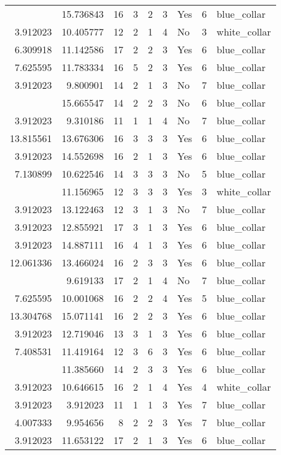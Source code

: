\documentclass[
]{article}
\begin{document}
\begin{longtable}[t]{rrrrrllrl}
\addlinespace
8.942461 & 15.736843 & 16 & 3 & 2 & 3 & Yes & 6 & blue\_collar\\
3.912023 & 10.405777 & 12 & 2 & 1 & 4 & No & 3 & white\_collar\\
6.309918 & 11.142586 & 17 & 2 & 2 & 3 & Yes & 6 & blue\_collar\\
7.625595 & 11.783334 & 16 & 5 & 2 & 3 & Yes & 6 & blue\_collar\\
3.912023 & 9.800901 & 14 & 2 & 1 & 3 & No & 7 & blue\_collar\\
\addlinespace
13.910866 & 15.665547 & 14 & 2 & 2 & 3 & No & 6 & blue\_collar\\
3.912023 & 9.310186 & 11 & 1 & 1 & 4 & No & 7 & blue\_collar\\
13.815561 & 13.676306 & 16 & 3 & 3 & 3 & Yes & 6 & blue\_collar\\
3.912023 & 14.552698 & 16 & 2 & 1 & 3 & Yes & 6 & blue\_collar\\
7.130899 & 10.622546 & 14 & 3 & 3 & 3 & No & 5 & blue\_collar\\
\addlinespace
5.010635 & 11.156965 & 12 & 3 & 3 & 3 & Yes & 3 & white\_collar\\
3.912023 & 13.122463 & 12 & 3 & 1 & 3 & No & 7 & blue\_collar\\
3.912023 & 12.855921 & 17 & 3 & 1 & 3 & Yes & 6 & blue\_collar\\
3.912023 & 14.887111 & 16 & 4 & 1 & 3 & Yes & 6 & blue\_collar\\
12.061336 & 13.466024 & 16 & 2 & 3 & 3 & Yes & 6 & blue\_collar\\
\addlinespace
3.912023 & 9.619133 & 17 & 2 & 1 & 4 & No & 7 & blue\_collar\\
7.625595 & 10.001068 & 16 & 2 & 2 & 4 & Yes & 5 & blue\_collar\\
13.304768 & 15.071141 & 16 & 2 & 2 & 3 & Yes & 6 & blue\_collar\\
3.912023 & 12.719046 & 13 & 3 & 1 & 3 & Yes & 6 & blue\_collar\\
7.408531 & 11.419164 & 12 & 3 & 6 & 3 & Yes & 6 & blue\_collar\\
\addlinespace
7.843849 & 11.385660 & 14 & 2 & 3 & 3 & Yes & 6 & blue\_collar\\
3.912023 & 10.646615 & 16 & 2 & 1 & 4 & Yes & 4 & white\_collar\\
3.912023 & 3.912023 & 11 & 1 & 1 & 3 & Yes & 7 & blue\_collar\\
4.007333 & 9.954656 & 8 & 2 & 2 & 3 & Yes & 7 & blue\_collar\\
3.912023 & 11.653122 & 17 & 2 & 1 & 3 & Yes & 6 & blue\_collar\\

\end{longtable}
\end{document}
